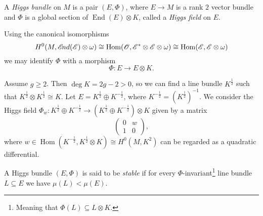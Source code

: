 \documentclass[A4paper, 12pt, british, reqno]{amsart}
\DeclareMathOperator{\Hom}{Hom}
\DeclareMathOperator{\End}{End}
\newcommand{\ot}{\otimes}
\newcommand{\op}{\oplus}
\newcommand{\dual}{^{*}}
\begin{document}
%
%
%

\begin{defn}
    A \textit{Higgs bundle} on $M$ is a pair $(E,\Phi)$, where $E\to M$ is a rank $2$ vector bundle and $\Phi$ is a global section of $\End(E)\ot K$, called a \textit{Higgs field} on $E$.
\end{defn}

\begin{rem}
    Using the canonical isomorphisms
    \[ H^{0}(M,\sEnd(\E)\ot \w)\cong \Hom(\O,\E\dual \ot \E\ot \w)\cong \Hom(\E,\E\ot \w) \]
    we may identify $\Phi$ with a morphism
    \[ \Phi\colon E\to E\ot K. \]
\end{rem}


\begin{exa}
    Assume $g\geqslant 2$.
    Then $\deg{K}=2g-2>0$, so we can find a line bundle $K^{\frac{1}{2}}$ such that $K^{\frac{1}{2}}\ot K^{\frac{1}{2}}\cong K$.
    Let $E=K^{\frac{1}{2}}\op K^{-\frac{1}{2}}$, where $K^{-\frac{1}{2}}=(K^{\frac{1}{2}})^{-1}$.
    We consider the Higgs field $\Phi_{w}\colon K^{\frac{1}{2}}\op K^{-\frac{1}{2}}\to (K^{\frac{1}{2}}\op K^{-\frac{1}{2}})\ot K$ given by a matrix
    \[
	\begin{pmatrix}
	    0 & w \\
	    1 & 0
	\end{pmatrix},
    \]
    where $w\in \Hom(K^{-\frac{1}{2}},K^{\frac{1}{2}}\ot K)\cong H^{0}(M,K^{2})$ can be regarded as a quadratic differential.
\end{exa}

\begin{defn}[Stability]
A Higgs bundle $(E,\Phi)$ is said to be \textit{stable} if for every $\Phi$-invariant\footnote{Meaning that $\Phi(L)\subseteq L\ot K$.} line bundle $L\subseteq E$ we have $\mu(L)<\mu(E)$.
\end{defn}
\end{document}
